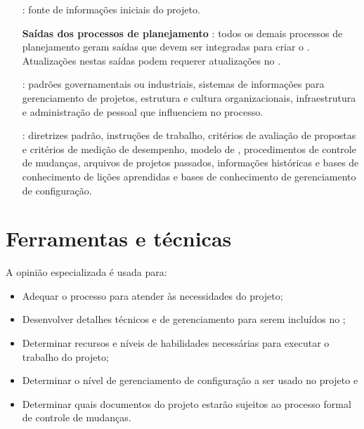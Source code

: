 \begin{itemize}
	
	\item[\textbf{\termo}]: fonte de informações iniciais do projeto.
	
	\item[\textbf{Saídas dos processos de planejamento}]: todos os demais processos de planejamento geram saídas que devem ser integradas para criar o \planproj. Atualizações nestas saídas podem requerer atualizações no \planproj.
	
	\item[\textbf{\amb}]: padrões governamentais ou industriais, sistemas de informações para gerenciamento de projetos, estrutura e cultura organizacionais, infraestrutura e administração de pessoal que influenciem no processo.
	
	
	\item[\textbf{\ativ}]: diretrizes padrão, instruções de trabalho, critérios de avaliação de propostas e critérios de medição de desempenho, modelo de \planproj, procedimentos de controle de mudanças, arquivos de projetos passados, informações históricas e bases de conhecimento de lições aprendidas e bases de conhecimento de gerenciamento de configuração.
	
\end{itemize}

\section{Ferramentas e técnicas}

A opinião especializada é usada para:

\begin{itemize}

	\item Adequar o processo para atender às necessidades do projeto;

	\item Desenvolver detalhes técnicos e de gerenciamento para serem incluídos no \planproj;
	
	\item  Determinar recursos e níveis de habilidades necessárias para executar o trabalho do projeto;
	
	\item Determinar o nível de gerenciamento de configuração a ser usado no projeto e
	
	\item Determinar quais documentos do projeto estarão sujeitos ao processo formal de controle de mudanças.
	
\end{itemize}

